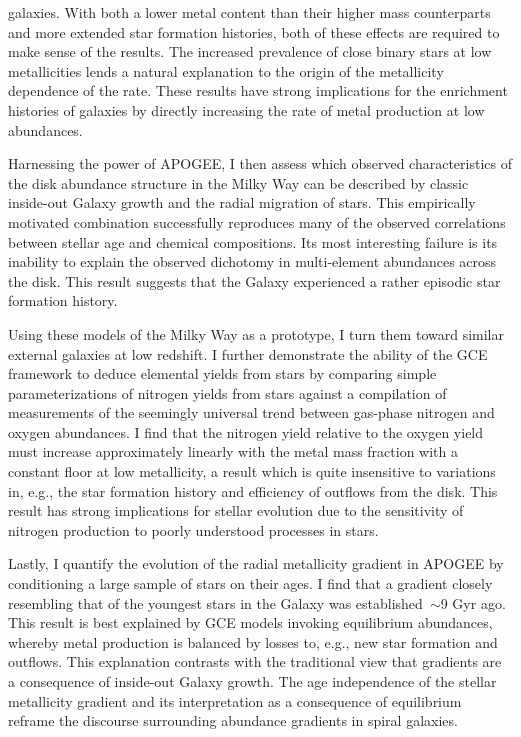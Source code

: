 \documentclass[main.tex]{subfiles}
\begin{document}
\begin{doublespace}
galaxies.
With both a lower metal content than their higher mass counterparts and more
extended star formation histories, both of these effects are required to
make sense of the results.
The increased prevalence of close binary stars at low metallicities lends a
natural explanation to the origin of the metallicity dependence of the rate.
These results have strong implications for the enrichment histories of galaxies
by directly increasing the rate of metal production at low abundances.
\par
Harnessing the power of APOGEE, I then assess which observed characteristics of
the disk abundance structure in the Milky Way can be described by classic
inside-out Galaxy growth and the radial migration of stars.
This empirically motivated combination successfully reproduces many of the
observed correlations between stellar age and chemical compositions.
Its most interesting failure is its inability to explain the observed dichotomy
in multi-element abundances across the disk.
This result suggests that the Galaxy experienced a rather episodic star
formation history.
\par
Using these models of the Milky Way as a prototype, I turn them toward similar
external galaxies at low redshift.
I further demonstrate the ability of the GCE framework to deduce elemental
yields from stars by comparing simple parameterizations of nitrogen yields from
stars against a compilation of measurements of the seemingly universal trend
between gas-phase nitrogen and oxygen abundances.
I find that the nitrogen yield relative to the oxygen yield must increase
approximately linearly with the metal mass fraction with a constant floor at
low metallicity, a result which is quite insensitive to variations in, e.g.,
the star formation history and efficiency of outflows from the disk.
This result has strong implications for stellar evolution due to the sensitivity
of nitrogen production to poorly understood processes in stars.
\par
Lastly, I quantify the evolution of the radial metallicity gradient in APOGEE
by conditioning a large sample of stars on their ages.
I find that a gradient closely resembling that of the youngest stars in the
Galaxy was established~$\sim$9 Gyr ago.
This result is best explained by GCE models invoking equilibrium abundances,
whereby metal production is balanced by losses to, e.g., new star formation and
outflows.
This explanation contrasts with the traditional view that gradients are a
consequence of inside-out Galaxy growth.
The age independence of the stellar metallicity gradient and its interpretation
as a consequence of equilibrium reframe the discourse surrounding abundance
gradients in spiral galaxies.


\end{doublespace}
\end{document}
